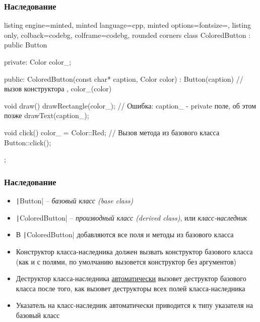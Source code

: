 \documentclass[10pt]{beamer}
\begin{document}
\begin{frame}[fragile]
\frametitle{Наследование}
\begin{itemize}
\begin{tcblisting}{listing engine=minted, minted language=cpp, minted options={fontsize=\scriptsize}, listing only, colback=codebg, colframe=codebg, rounded corners}
class ColoredButton : public Button {
private:
  Color color_;

public:
  ColoredButton(const char* caption, Color color)
    : Button(caption) // вызов конструктора
    , color_(color)
  {}

  void draw() {
    drawRectangle(color_);
    // Ошибка: caption_ - private поле, об этом позже
    drawText(caption_);
  }

  void click() {
    color_ = Color::Red;
    // Вызов метода из базового класса
    Button::click();
  }
};
\end{tcblisting}
\end{itemize}
\end{frame}

\begin{frame}[fragile]
\frametitle{Наследование}
\begin{itemize}
\item \texttt|Button| -- \textit{базовый класс (base class)}
\pause
\item \texttt|ColoredButton| -- \textit{производный класс (derived class)}, или \textit{класс-наследник}
\pause
\item В \texttt|ColoredButton| добавляются все поля и методы из базового класса
\pause
\item Конструктор класса-наследника должен вызвать конструктор базового класса (как и с полями, по умолчанию вызовется конструктор без аргументов)
\pause
\item Деструктор класса-наследника \underline{автоматически} вызовет деструктор базового класса после того, как вызовет деструкторы всех полей класса-наследника
\pause
\item Указатель на класс-наследник автоматически приводится к типу указателя на базовый класс
\end{itemize}
\end{frame}
\end{document}
